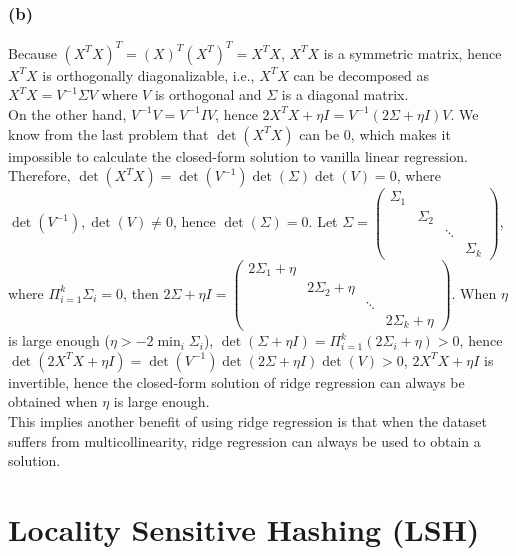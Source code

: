 \documentclass{article}
\begin{document}
            \subsubsection*{(b)}
            Because $(X^TX)^T=(X)^T(X^T)^T=X^TX$, $X^TX$ is a symmetric matrix, hence $X^TX$ is orthogonally diagonalizable, i.e., 
            $X^TX$ can be decomposed as $X^TX=V^{-1}\Sigma V$ where $V$ is orthogonal and $\Sigma$ is a diagonal matrix.\\
            On the other hand, $V^{-1}V=V^{-1}IV$, hence $2X^TX+\eta I=V^{-1}(2\Sigma + \eta I)V$. We know from the last problem that $\det(X^TX)$ can be 0, 
            which makes it impossible to calculate the closed-form solution to vanilla linear regression. \\
            Therefore, $\det(X^TX)=\det(V^{-1})\det(\Sigma)\det(V)=0$, where $\det(V^{-1}),\det(V)\neq 0$, hence $\det(\Sigma)=0$.
            Let $\Sigma=\begin{pmatrix}\Sigma_1&&\\&\Sigma_2&\\&&\ddots\\&&&\Sigma_k\end{pmatrix}$, where $\Pi_{i=1}^k \Sigma_i=0$, 
            then $2\Sigma+\eta I=\begin{pmatrix}2\Sigma_1+\eta&&\\&2\Sigma_2+\eta&\\&&\ddots\\&&&2\Sigma_k+\eta\end{pmatrix}$.
            When $\eta$ is large enough ($\eta>-2\min_i\Sigma_i$), $\det(\Sigma+\eta I)=\Pi_{i=1}^k(2\Sigma_i+\eta)>0$, hence $\det(2X^TX+\eta I)=\det(V^{-1})\det(2\Sigma+\eta I)\det(V)>0$,
            $2X^TX+\eta I$ is invertible, hence the closed-form solution of ridge regression can always be obtained when $\eta$ is large enough.\\
            This implies another benefit of using ridge regression is that when the dataset suffers from multicollinearity, ridge regression can always be used to obtain a solution.

        

    \section{Locality Sensitive Hashing (LSH)}

        \subsection{}
        
\end{document}
